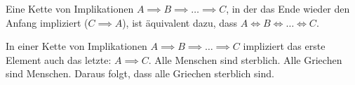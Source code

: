\documentclass[../../main.tex]{subfiles}
\begin{document}
        {Eine Kette von Implikationen $A \implies B \implies \dots \implies C$, in der das Ende wieder den Anfang impliziert ($C \implies A$), ist äquivalent dazu, dass $A \iff B \iff \dots \iff C$.}
        {}
    
        {In einer Kette von Implikationen $A \implies B \implies \dots \implies C$ impliziert das erste Element auch das letzte: $A \implies C$.}
        {%
        Alle Menschen sind sterblich. Alle Griechen sind Menschen. Daraus folgt, dass alle Griechen sterblich sind.}
\end{document}
